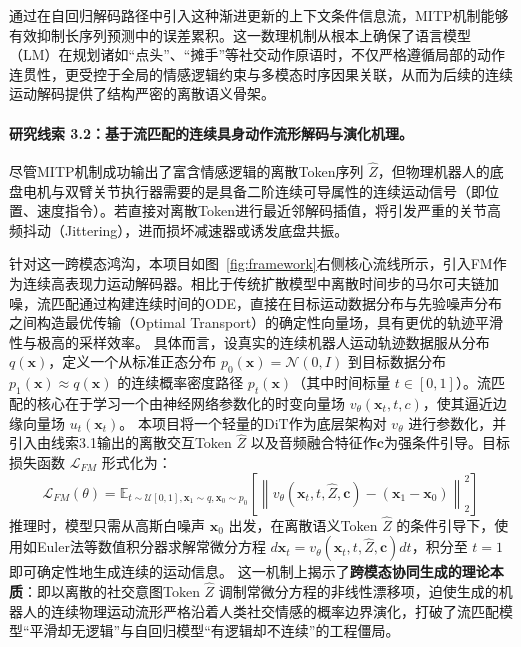 通过在自回归解码路径中引入这种渐进更新的上下文条件信息流，MITP机制能够有效抑制长序列预测中的误差累积。这一数理机制从根本上确保了语言模型（LM）在规划诸如``点头''、``摊手''等社交动作原语时，不仅严格遵循局部的动作连贯性，更受控于全局的情感逻辑约束与多模态时序因果关联，从而为后续的连续运动解码提供了结构严密的离散语义骨架。

\paragraph{\textbf{研究线索 3.2：基于流匹配的连续具身动作流形解码与演化机理。}}

尽管MITP机制成功输出了富含情感逻辑的离散Token序列 $\hat{Z}$，但物理机器人的底盘电机与双臂关节执行器需要的是具备二阶连续可导属性的连续运动信号（即位置、速度指令）。若直接对离散Token进行最近邻解码插值，将引发严重的关节高频抖动（Jittering），进而损坏减速器或诱发底盘共振。

针对这一跨模态鸿沟，本项目如图~\ref{fig:framework}右侧核心流线所示，引入FM作为连续高表现力运动解码器。相比于传统扩散模型中离散时间步的马尔可夫链加噪，流匹配通过构建连续时间的ODE，直接在目标运动数据分布与先验噪声分布之间构造最优传输（Optimal Transport）的确定性向量场，具有更优的轨迹平滑性与极高的采样效率。
具体而言，设真实的连续机器人运动轨迹数据服从分布 $q(\mathbf{x})$，定义一个从标准正态分布 $p_0(\mathbf{x}) = \mathcal{N}(0, I)$ 到目标数据分布 $p_1(\mathbf{x}) \approx q(\mathbf{x})$ 的连续概率密度路径 $p_t(\mathbf{x})$（其中时间标量 $t \in[0, 1]$）。流匹配的核心在于学习一个由神经网络参数化的时变向量场 $v_\theta(\mathbf{x}_t, t, c)$，使其逼近边缘向量场 $u_t(\mathbf{x}_t)$。
本项目将一个轻量的DiT作为底层架构对 $v_\theta$ 进行参数化，并引入由线索3.1输出的离散交互Token $\hat{Z}$ 以及音频融合特征作$\mathbf{c}$为强条件引导。目标损失函数 $\mathcal{L}_{FM}$ 形式化为：
\begin{equation}
\mathcal{L}_{FM}(\theta) = \mathbb{E}_{t \sim \mathcal{U}[0,1], \mathbf{x}_1 \sim q, \mathbf{x}_0 \sim p_0} \left[ \left\| v_\theta(\mathbf{x}_t, t, \hat{Z}, \mathbf{c}) - (\mathbf{x}_1 - \mathbf{x}_0) \right\|^2_2 \right]
\end{equation}
推理时，模型只需从高斯白噪声 $\mathbf{x}_0$ 出发，在离散语义Token $\hat{Z}$ 的条件引导下，使用如Euler法等数值积分器求解常微分方程 $d\mathbf{x}_t = v_\theta(\mathbf{x}_t, t, \hat{Z}, \mathbf{c}) dt$，积分至 $t=1$ 即可确定性地生成连续的运动信息。
这一机制上揭示了\textbf{跨模态协同生成的理论本质}：即以离散的社交意图Token $\hat{Z}$ 调制常微分方程的非线性漂移项，迫使生成的机器人的连续物理运动流形严格沿着人类社交情感的概率边界演化，打破了流匹配模型“平滑却无逻辑”与自回归模型“有逻辑却不连续”的工程僵局。


